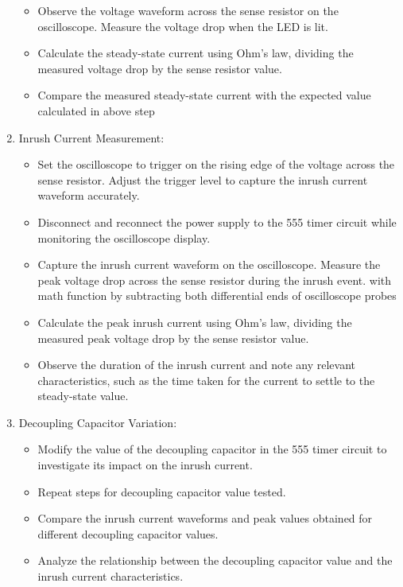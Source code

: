 \documentclass[a4paper,11pt]{article}%
\begin{document}
\begin{enumerate}
\begin{itemize}
		      \item Observe the voltage waveform across the sense resistor on the oscilloscope. Measure the voltage drop when the LED is lit.
		      \item Calculate the steady-state current using Ohm's law, dividing the measured voltage drop by the sense resistor value.
		      \item  Compare the measured steady-state current with the expected value calculated in above step
	      \end{itemize}
	\item Inrush Current Measurement:
	      \begin{itemize}
		      \item Set the oscilloscope to trigger on the rising edge of the voltage across the sense resistor. Adjust the trigger level to capture the inrush current waveform accurately.
		      \item Disconnect and reconnect the power supply to the 555 timer circuit while monitoring the oscilloscope display.
		      \item Capture the inrush current waveform on the oscilloscope. Measure the peak voltage drop across the sense resistor during the inrush event. with math function by subtracting both differential ends of oscilloscope probes
		      \item Calculate the peak inrush current using Ohm's law, dividing the measured peak voltage drop by the sense resistor value.
		      \item Observe the duration of the inrush current and note any relevant characteristics, such as the time taken for the current to settle to the steady-state value.
	      \end{itemize}
	\item Decoupling Capacitor Variation:
	      \begin{itemize}
		      \item Modify the value of the decoupling capacitor in the 555 timer circuit to investigate its impact on the inrush current.
		      \item Repeat steps for decoupling capacitor value tested.
		      \item Compare the inrush current waveforms and peak values obtained for different decoupling capacitor values.
		      \item Analyze the relationship between the decoupling capacitor value and the inrush current characteristics.
	      \end{itemize}
\end{enumerate}
\end{document}
